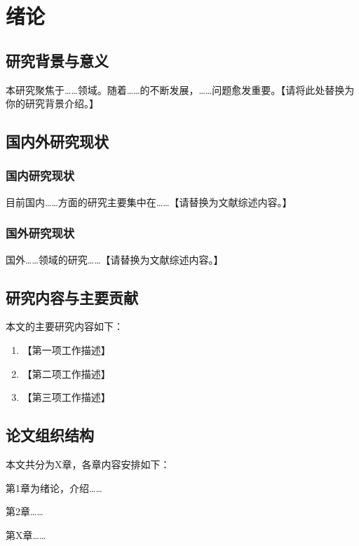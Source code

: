 \chapter{绪论}

\section{研究背景与意义}

本研究聚焦于……领域。随着……的不断发展，……问题愈发重要。【请将此处替换为你的研究背景介绍。】

\section{国内外研究现状}

\subsection{国内研究现状}

目前国内……方面的研究主要集中在……【请替换为文献综述内容。】

\subsection{国外研究现状}

国外……领域的研究……【请替换为文献综述内容。】

\section{研究内容与主要贡献}

本文的主要研究内容如下：

\begin{enumerate}
    \item 【第一项工作描述】
    \item 【第二项工作描述】
    \item 【第三项工作描述】
\end{enumerate}

\section{论文组织结构}

本文共分为X章，各章内容安排如下：

第1章为绪论，介绍……

第2章……

第X章……
